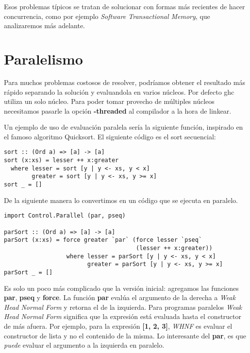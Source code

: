 Esos problemas típicos se tratan de solucionar con formas más recientes de hacer concurrencia, como por ejemplo \textit{Software Transactional Memory}, que analizaremos más adelante.




\section{Paralelismo} %
\label{sub:paralelismo}

Para muchos problemas costosos de resolver, podríamos obtener el resultado más rápido separando la solución y evaluandola en varios núcleos. Por defecto ghc utiliza un solo núcleo. Para poder tomar provecho de múltiples núcleos necesitamos pasarle la opción \textbf{-threaded} al compilador a la hora de linkear.

Un ejemplo de uso de evaluación paralela sería la siguiente función, inspirado en el famoso algoritmo Quicksort. El siguiente código es el sort secuencial:

\begin{lstlisting}
sort :: (Ord a) => [a] -> [a]
sort (x:xs) = lesser ++ x:greater
  where lesser = sort [y | y <- xs, y < x]
        greater = sort [y | y <- xs, y >= x]
sort _ = []
\end{lstlisting}

De la siguiente manera lo convertimos en un código que se ejecuta en paralelo.

\begin{lstlisting}
import Control.Parallel (par, pseq)

parSort :: (Ord a) => [a] -> [a]
parSort (x:xs) = force greater `par` (force lesser `pseq`
                                      (lesser ++ x:greater))
                  where lesser = parSort [y | y <- xs, y < x]
                        greater = parSort [y | y <- xs, y >= x]
parSort _ = []
\end{lstlisting}

Es solo un poco más complicado que la versión inicial: agregamos las funciones \textbf{par}, \textbf{pseq} y \textbf{force}. La función \textbf{par} evalúa el argumento de la derecha a \textit{Weak Head Normal Form} y retorna el de la izquierda. Para programas paralelos \textit{Weak Head Normal Form} significa que la expresión está evaluada hasta el constructor de más afuera. Por ejemplo, para la expresión \textbf{[1, 2, 3]}, \textit{WHNF} es evaluar el constructor de lista y no el contenido de la misma. Lo interesante del \textbf{par}, es que \textit{puede} evaluar el argumento a la izquierda en paralelo.

